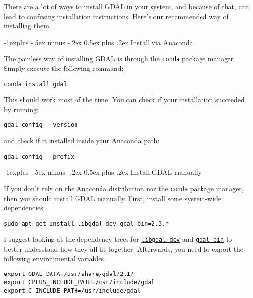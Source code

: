\documentclass[10pt,landscape]{article}
\makeatletter
\renewcommand{\subsection}{\@startsection{subsection}{2}{0mm}%
                                {-1explus -.5ex minus -.2ex}%
                                {0.5ex plus .2ex}%
                                {\normalfont\normalsize\bfseries}}
\makeatother
\begin{document}
\begin{multicols}{3}
There are a lot of ways to install GDAL in your system, and because of that,
    can lead to confusing installation instructions. Here's our
    recommended way of installing them.

\subsection{Install via Anaconda}

    The painless way of installing GDAL is through the 
    \href{https://conda.io/en/latest/}{\texttt{conda} package manager}.
    Simply execute the following command:

\begin{lstlisting}
conda install gdal
\end{lstlisting}

This should work most of the time. You can check if your installation
    succeeded by running:

\begin{lstlisting}
gdal-config --version
\end{lstlisting}

and check if it installed inside your Anaconda path:

\begin{lstlisting}
gdal-config --prefix
\end{lstlisting}

\subsection{Install GDAL manually}

If you don't rely on the Anaconda distribution nor the \texttt{conda}
package manager, then you should install GDAL manually. First, install some
system-wide dependencies:

\begin{lstlisting}
sudo apt-get install libgdal-dev gdal-bin=2.3.* 
\end{lstlisting}

I suggest looking at the dependency trees for
\href{https://packages.ubuntu.com/trusty/libgdal-dev}{\texttt{libgdal-dev}}
and \href{https://packages.ubuntu.com/trusty/gdal-bin}{\texttt{gdal-bin}}
to better understand how they all fit together. Afterwards, you need to export the following environmental variables

\begin{lstlisting}
export GDAL_DATA=/usr/share/gdal/2.1/
export CPLUS_INCLUDE_PATH=/usr/include/gdal
export C_INCLUDE_PATH=/usr/include/gdal
\end{lstlisting}


\end{multicols}
\end{document}
